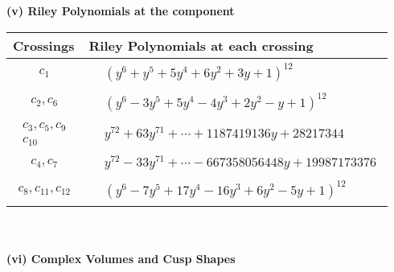 \documentclass[1p]{elsarticle_modified}
\theoremstyle{definition}
\begin{document}
\newpage\renewcommand{\arraystretch}{1}
\flushleft \textbf{(v) Riley Polynomials at the component}\newline \\
\begin{tabular}{m{50pt}|m{274pt}}
Crossings & \hspace{64pt}Riley Polynomials at each crossing \\
\hline $$\begin{aligned}c_{1}\end{aligned}$$&$\begin{aligned}
&(y^6+y^5+5 y^4+6 y^2+3 y+1)^{12}
\end{aligned}$\\
\hline $$\begin{aligned}c_{2},c_{6}\end{aligned}$$&$\begin{aligned}
&(y^6-3 y^5+5 y^4-4 y^3+2 y^2- y+1)^{12}
\end{aligned}$\\
\hline $$\begin{aligned}c_{3},c_{5},c_{9}\\c_{10}\end{aligned}$$&$\begin{aligned}
&y^{72}+63 y^{71}+\cdots+1187419136 y+28217344
\end{aligned}$\\
\hline $$\begin{aligned}c_{4},c_{7}\end{aligned}$$&$\begin{aligned}
&y^{72}-33 y^{71}+\cdots-667358056448 y+19987173376
\end{aligned}$\\
\hline $$\begin{aligned}c_{8},c_{11},c_{12}\end{aligned}$$&$\begin{aligned}
&(y^6-7 y^5+17 y^4-16 y^3+6 y^2-5 y+1)^{12}
\end{aligned}$\\
\hline
\end{tabular}\\~\\
\newpage\flushleft \textbf{(vi) Complex Volumes and Cusp Shapes}
\end{document}

